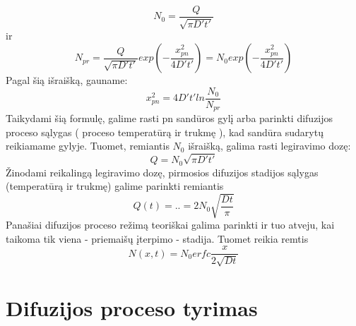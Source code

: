 \documentclass[11pt,a4paper]{article}
\begin{document}
\begin{equation}
N_0 = \frac{Q}{\sqrt{\pi D't'}}
\end{equation}
ir
\begin{equation}
N_{pr} = \frac{Q}{\sqrt{\pi D't'}}exp \left ( - \frac{x^2_{pn}}{4D't'} \right ) = N_0 exp \left ( - \frac{x^2_{pn}}{4D't'} \right ) 
\end{equation}
Pagal šią išraišką, gauname:
\begin{equation}
x^2_{pn} = 4D't'ln \frac{N_0}{N_{pr}}
\end{equation}
Taikydami šią formulę, galime rasti pn sandūros gylį arba parinkti difuzijos proceso sąlygas ( proceso temperatūrą ir trukmę ), kad sandūra sudarytų reikiamame gylyje. Tuomet, remiantis $N_0$ išraišką, galima rasti legiravimo dozę:
\begin{equation}
Q = N_{0}\sqrt{\pi D't'}
\end{equation}
Žinodami reikalingą legiravimo dozę, pirmosios difuzijos stadijos sąlygas (temperatūrą ir trukmę) galime parinkti remiantis
\begin{equation}
Q(t) = .. = 2N_0 \sqrt{\frac{Dt}{\pi}}
\end{equation}
Panašiai difuzijos proceso režimą teoriškai galima parinkti ir tuo atveju, kai taikoma tik viena - priemaišų įterpimo - stadija. Tuomet reikia remtis
\begin{equation}
N(x,t) = N_0 erfc\frac{x}{2 \sqrt{Dt}}
\end{equation}


\section{Difuzijos proceso tyrimas}
\end{document}
